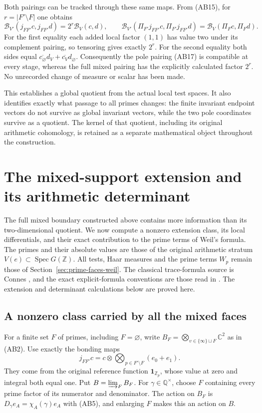 \documentclass[11pt,a4paper]{article}
\theoremstyle{definition}\newtheorem{definition}[theorem]{Definition}
\newcommand{\Z}{\mathbb Z}\newcommand{\Q}{\mathbb Q}
\newcommand{\C}{\mathbb C}\newcommand{\R}{\mathbb R}
\newcommand{\Spec}{\operatorname{Spec}}\newcommand{\SpecMon}{\operatorname{Spec}_{\mathrm{mon}}}
\begin{document}
Both pairings can be tracked through these same maps. From (AB15),
for $r=|F'\setminus F|$ one obtains
\[
 \mathscr B_{V'}(j_{FF'}c,j_{FF'}d)=2^r\mathscr B_V(c,d),
 \qquad
 \mathscr B_{V'}(\Pi_{F'}j_{FF'}c,\Pi_{F'}j_{FF'}d)
 =\mathscr B_V(\Pi_Fc,\Pi_Fd).
 \tag{AB24}
\]
For the first equality each added local factor $(1,1)$ has value two
under its complement pairing, so tensoring gives exactly $2^r$.
For the second equality both sides equal
$\overline{c_\varnothing}d_V+\overline{c_V}d_\varnothing$.
Consequently the pole pairing (AB17) is compatible at every stage,
whereas the full mixed pairing has the explicitly calculated factor
$2^r$. No unrecorded change of measure or scalar has been made.

This establishes a global quotient from the actual local test spaces.
It also identifies exactly what passage to all primes changes: the
finite invariant endpoint vectors do not survive as global invariant
vectors, while the two pole coordinates survive as a quotient. The
kernel of that quotient, including its original arithmetic cohomology,
is retained as a separate mathematical object throughout the construction.



\section{The mixed-support extension and its arithmetic determinant}
\label{sec:mixed-extension-trace}
The full mixed boundary constructed above contains more information than its
two-dimensional quotient. We now compute a nonzero extension class, its local
differentials, and their exact contribution to the prime terms of Weil's
formula. The primes and their absolute values are those of the original
arithmetic stratum $V(e)\subset\Spec G(\Z)$. All tests, Haar measures and
the prime terms $W_p$ remain those of Section~\ref{sec:prime-faces-weil}.
The classical trace-formula source is Connes
\cite[Section III and Section V]{Connes1998}, and the exact explicit-formula
conventions are those read in \cite[\texttt{wp}, \texttt{arch}]{Connes2026}.
The extension and determinant calculations below are proved here.

\subsection{A nonzero class carried by all the mixed faces}
For a finite set $F$ of primes, including $F=\varnothing$, write
$B_F=\bigotimes_{v\in\{\infty\}\sqcup F}\C^2$ as in (AB2).
Use exactly the bonding maps
\[
 j_{FF'}c=c\otimes\bigotimes_{p\in F'\setminus F}(e_0+e_1).
 \tag{ME1}
\]
They come from the original reference function $\mathbf1_{\Z_p}$,
whose value at zero and integral both equal one. Put
$B=\varinjlim_F B_F$. For $\gamma\in\Q^\times$, choose $F$ containing
every prime factor of its numerator and denominator. The action on $B_F$ is
$D_\gamma e_A=\chi_A(\gamma)e_A$ with (AB5), and enlarging $F$ makes
this an action on $B$.
\end{document}
